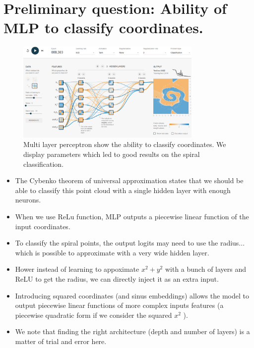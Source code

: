 \documentclass[a4paper]{article}
\begin{document}




\section*{Preliminary question: Ability of MLP to classify coordinates.}
\begin{figure}[H]
    \centering
    \includegraphics[width=0.8\textwidth]{figures/mlp_manual.png}
    \caption{Multi layer perceptron show the ability to  classify coordinates. We display parameters which led to good results on the spiral classification.}
    \label{fig:MPL_search}
\end{figure}

\begin{itemize}
    \item The Cybenko theorem of universal approximation states that we should be able to classify this point cloud with a single hidden layer with enough neurons. 
    \item When we use ReLu function, MLP outputs a piecewise linear function of the input coordinates.
    \item To classify the spiral points, the output logits may need to use the radius... which is possible to approximate with a very wide hidden layer.
    \item Hower instead of learning to appoximate $x^2 + y^2$ with a bunch of layers and ReLU to get the radius, we can directly inject it as an extra input.
    \item Introducing squared coordinates (and sinus embeddings) allows the model to output piecewise linear functions of more complex inputs features (a piecewise quadratic form if we consider the squared $x^2$ ).
    \item We note that finding the right architecture (depth and number of layers) is a matter of trial and error here.
\end{itemize}
\end{document}
